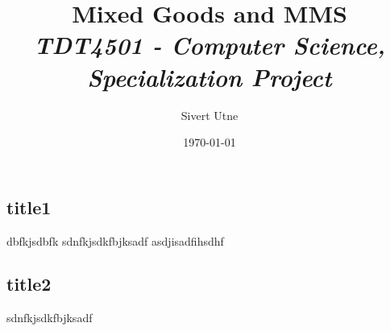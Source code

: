 


\begin{titlingpage}
    \title{
        \textbf{Mixed Goods and MMS}\\
        \textit{\normalsize{TDT4501 - Computer Science, Specialization Project}}\\
    }
    \author{Sivert Utne}
    \date{\today}
    \maketitle
\end{titlingpage}



\newpage
\tableofcontents
\listoffigures
\listoftables

\newpage
{}  %



\newpage
{}


\newpage
\section*{\appendixname}
\clearpage
\renewcommand{\thesubsection}{\Alph{subsection}}
\renewcommand{\thepage}{\thesubsection-\arabic{page}}

\clearpage
\subsection{title1}
\setcounter{page}{1}
dbfkjsdbfk sdnfkjsdkfbjksadf
\clearpage
asdjisadfihsdhf

\clearpage
\subsection{title2}
\setcounter{page}{1}
sdnfkjsdkfbjksadf

